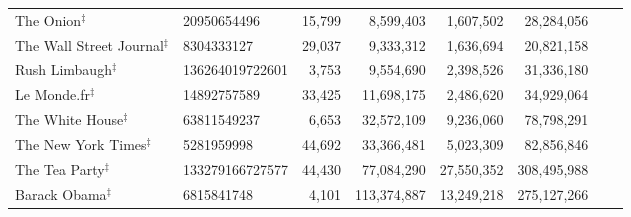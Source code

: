 \begin{longtable}{llrrrrrr}
                              The Onion$^\ddagger$ &      20950654496 &  15,799 &   8,599,403 &  1,607,502 &  28,284,056 &             &           \\
                The Wall Street Journal$^\ddagger$ &       8304333127 &  29,037 &   9,333,312 &  1,636,694 &  20,821,158 &             &           \\
                          Rush Limbaugh$^\ddagger$ &  136264019722601 &   3,753 &   9,554,690 &  2,398,526 &  31,336,180 &             &           \\
                            Le Monde.fr$^\ddagger$ &      14892757589 &  33,425 &  11,698,175 &  2,486,620 &  34,929,064 &             &           \\
                        The White House$^\ddagger$ &      63811549237 &   6,653 &  32,572,109 &  9,236,060 &  78,798,291 &             &           \\
                     The New York Times$^\ddagger$ &       5281959998 &  44,692 &  33,366,481 &  5,023,309 &  82,856,846 &             &           \\
                          The Tea Party$^\ddagger$ &  133279166727577 &  44,430 &  77,084,290 & 27,550,352 & 308,495,988 &             &           \\
                           Barack Obama$^\ddagger$ &       6815841748 &   4,101 & 113,374,887 & 13,249,218 & 275,127,266 &             &           \\
\end{longtable}
